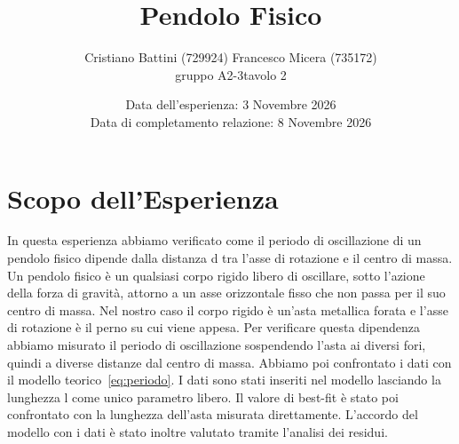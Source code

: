 \documentclass[a4paper]{article}
\title{Pendolo Fisico}
\author{Cristiano Battini (729924)\quad
        \vspace{3mm}
        Francesco Micera (735172)\\
        gruppo A2-3\quad tavolo 2}
\date{Data dell'esperienza: 3 Novembre 2026\\
      Data di completamento relazione: 8 Novembre 2026}
\begin{document}
\maketitle
\section{Scopo dell'Esperienza}\label{sec:scopo}
In questa esperienza abbiamo verificato come il periodo di oscillazione di un pendolo fisico dipende dalla distanza d tra l’asse di rotazione e il centro di massa. Un pendolo fisico è un qualsiasi corpo rigido libero di oscillare, sotto l’azione della forza di gravità, attorno a un asse orizzontale fisso che non passa per il suo centro di massa. Nel nostro caso il corpo rigido è un’asta metallica forata e l’asse di rotazione è il perno su cui viene appesa. Per verificare questa dipendenza abbiamo misurato il periodo di oscillazione sospendendo l’asta ai diversi fori, quindi a diverse distanze dal centro di massa. Abbiamo poi confrontato i dati con il modello teorico~\eqref{eq:periodo}. I dati sono stati inseriti nel modello lasciando la lunghezza l come unico parametro libero. Il valore di best-fit è stato poi confrontato con la lunghezza dell’asta misurata direttamente. L’accordo del modello con i dati è stato inoltre valutato tramite l’analisi dei residui.
\end{document}

